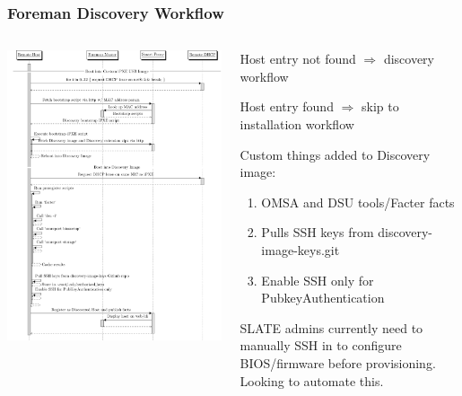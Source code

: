 \documentclass{beamer}
\begin{document}
\begin{frame}[fragile]
	\frametitle{Foreman Discovery Workflow}

	\begin{columns}
		\begin{column}{0.5\textwidth}
			\flushleft
			\includegraphics[width=\textwidth,height=\textheight-15mm,keepaspectratio]{discovery_sd}
		\end{column}

		\begin{column}{0.5\textwidth}
			\small
			Host entry not found $\Rightarrow$ discovery workflow

			Host entry found $\Rightarrow$ skip to installation workflow
			\vspace{.5cm}

			Custom things added to Discovery image:
			\begin{enumerate}
				\item OMSA and DSU tools/Facter facts
				\item Pulls SSH keys from discovery-image-keys.git
				\item Enable SSH only for PubkeyAuthentication
			\end{enumerate}

			SLATE admins currently need to manually SSH in to configure BIOS/firmware before provisioning. Looking to automate this.

		\end{column}
	\end{columns}
\end{frame}
\end{document}
